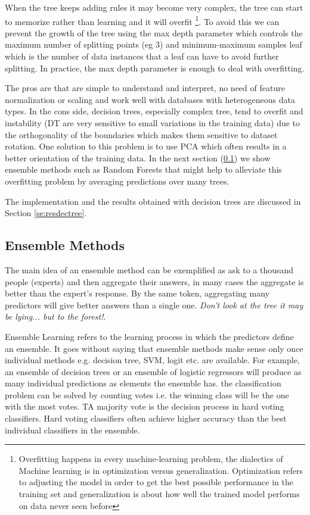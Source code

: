 \documentclass[11pt]{article}
\theoremstyle{definition}
\theoremstyle{remark}
\begin{document}
When the tree keeps adding rules it may become very complex, the tree can start to memorize rather than learning  and it will overfit \footnote{Overfitting happens in every machine-learning problem, the dialectics of Machine learning is in optimization versus generalization. Optimization refers to adjusting the model in order to get the best possible performance in the training set and generalization is about how well the trained model performs on data never seen before}. To avoid this we can prevent the growth of the tree using the max depth parameter which controls the maximum number of splitting points (eg 3) and minimum-maximum samples leaf which is the number of data instances that a leaf can have to avoid further splitting. In practice, the max depth parameter is enough to deal with overfitting.

The pros are that are simple to understand and interpret, no need of feature normalization or scaling and work well with databases with heterogeneous data types. In the cons side, decision trees, especially complex tree, tend to overfit and instability (DT are very sensitive to small variations in the training data) due to the orthogonality of the boundaries which makes them sensitive to dataset rotation. 
One solution to this problem is to use PCA which often results in a better orientation of the training data. In the next section (\ref{sse:ensemble}) we show ensemble methods such as Random Forests that might help to alleviate this overfitting problem by averaging predictions over many trees.

The implementation and the results obtained with decision trees are discussed in Section \ref{se:resdectree}.

\subsection{Ensemble Methods}
\label{sse:ensemble}
The main idea of an ensemble method can be exemplified as ask to a thousand people (experts) and then aggregate their answers, in many cases the aggregate is better than the expert's response. By the same token, aggregating many predictors will give better answers than a single one. \emph{Don't look at the tree it may be lying... but to the forest!}. 

Ensemble Learning refers to the learning process in which the predictors define an ensemble. It goes without saying that ensemble methods make sense only once individual methods e.g. decision tree, SVM, logit etc. are available. For example, an ensemble of decision trees or an ensemble of logistic regressors will produce as many individual predictions as elements the ensemble has. the classification problem can be solved by counting votes i.e. the winning class will be the one with the most votes. TA majority vote is the decision process in hard voting classifiers. Hard voting classifiers often achieve higher accuracy than the best individual classifiers in the ensemble. 
\end{document}

